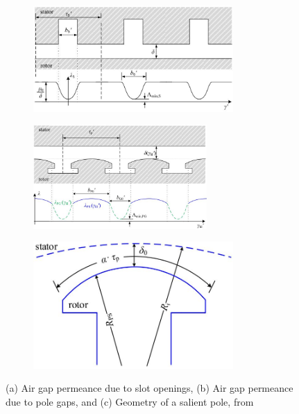 \begin{figure}[!t]
	\begin{subfigure}{0.5\textwidth}
		\centering
		\includegraphics[width=3in]{./Pictures/SlotPerm.jpg}
		\caption{}
	\end{subfigure}
	\begin{subfigure}{0.5\textwidth}
		\centering
		\includegraphics[width=2.6in]{./Pictures/PolePerm.jpg}
		\caption{}
	\end{subfigure}
	\begin{subfigure}{\textwidth}
		\centering
		\includegraphics[width=3in]{./Pictures/SalientGeom.jpg}
		\caption{}
	\end{subfigure}
	\caption{(a) Air gap permeance due to slot openings, (b) Air gap permeance due to pole gaps, and (c) Geometry of a salient pole, from \cite{AnaGapSal}}
	\label{fig:Perm}
\end{figure}





